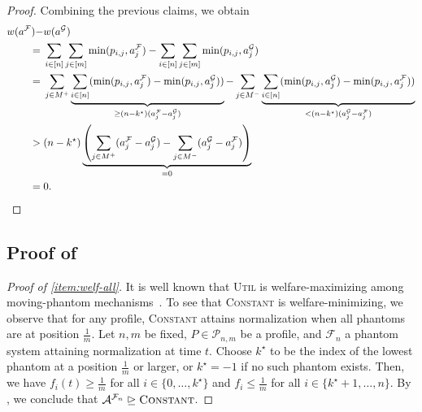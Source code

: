 \documentclass[11pt]{article}
\newcommand{\F}{\mathcal{F}}
\newcommand{\G}{\mathcal{G}}
\newcommand{\A}{\mathcal{A}}
\newcommand{\Constant}{\textsc{Constant} }
\newcommand{\Ut}{\textsc{Util} }
\begin{document}
\begin{proof}
    Combining the previous claims, we obtain
    \begin{align*}
        w(a^{\F}) - & w(a^{\G})\\
        = {} & \sum_{i \in [n]} \sum_{j \in [m]} \min(p_{i,j},a^\F_j) - \sum_{i \in [n]} \sum_{j \in [m]} \min(p_{i,j},a^\G_j)\\
        = {} & \sum_{j \in M^+} \underbrace{\sum_{i \in [n]} (\min(p_{i,j},a^\F_j)-\min(p_{i,j},a^\G_j))}_{\ge (n - k^\star)(a^\F_j-a^\G_j)} - \sum_{j \in M^-} \underbrace{\sum_{i \in [n]} (\min(p_{i,j},a^\G_j)-\min(p_{i,j},a^\F_j))}_{< (n - k^\star)(a^\G_j-a^\F_j)}\\
        > {} & (n - k^\star) \underbrace{\left(\sum_{j \in M^+} (a^\F_j-a^\G_j) - \sum_{j \in M^-} (a^\G_j-a^\F_j)\right)}_{=0}\\
        = {} & 0.\qedhere
    \end{align*}
\end{proof}

\subsection{Proof of }\label{app:thmPhantomDomination}

\thmPhantomDomination*

\begin{proof}[Proof of  \textnormal{\ref{item:welf-all}}]
    It is well known that \Ut is welfare-maximizing among moving-phantom mechanisms~\citep{freeman2021truthful}. 
    To see that \Constant is welfare-minimizing, we observe that for any profile, \Constant attains normalization when all phantoms are at position $\frac{1}{m}$. 
    Let $n, m$ be fixed, $P \in \mathcal{P}_{n,m}$ be a profile, and $\F_n$ a phantom system attaining normalization at time $t$. 
    Choose $k^\star$ to be the index of the lowest phantom at a position $\frac{1}{m}$ or larger, or $k^\star = -1$ if no such phantom exists. 
    Then, we have $f_i(t) \ge \frac{1}{m}$ for all $i \in \{0, \dots, k^\star\}$ and $f_i \le \frac{1}{m}$ for all $i \in \{k^\star+1, \dots, n\}$. 
    By , we conclude that $\A^{\F_n} \trianglerighteq \Constant$.
\end{proof}
\end{document}
